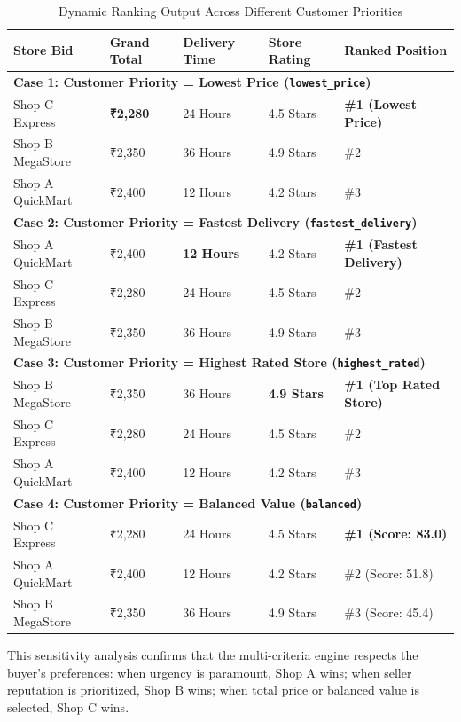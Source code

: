 \begin{table}[H]
\centering
\caption{Dynamic Ranking Output Across Different Customer Priorities}
\label{tab:ranking_sensitivity}
\begin{tabular}{p{2.9cm} p{2.1cm} p{2.3cm} p{2.2cm} >{\raggedright\arraybackslash}p{3.2cm}}
\toprule
\textbf{Store Bid} & \textbf{Grand Total} & \textbf{Delivery Time} & \textbf{Store Rating} & \textbf{Ranked Position} \\
\midrule
\multicolumn{5}{l}{\textbf{Case 1: Customer Priority = Lowest Price (\texttt{lowest\_price})}} \\
Shop C Express & \textbf{₹2,280} & 24 Hours & 4.5 Stars & \textbf{\#1 (Lowest Price)} \\
Shop B MegaStore & ₹2,350 & 36 Hours & 4.9 Stars & \#2 \\
Shop A QuickMart & ₹2,400 & 12 Hours & 4.2 Stars & \#3 \\
\midrule
\multicolumn{5}{l}{\textbf{Case 2: Customer Priority = Fastest Delivery (\texttt{fastest\_delivery})}} \\
Shop A QuickMart & ₹2,400 & \textbf{12 Hours} & 4.2 Stars & \textbf{\#1 (Fastest Delivery)} \\
Shop C Express & ₹2,280 & 24 Hours & 4.5 Stars & \#2 \\
Shop B MegaStore & ₹2,350 & 36 Hours & 4.9 Stars & \#3 \\
\midrule
\multicolumn{5}{l}{\textbf{Case 3: Customer Priority = Highest Rated Store (\texttt{highest\_rated})}} \\
Shop B MegaStore & ₹2,350 & 36 Hours & \textbf{4.9 Stars} & \textbf{\#1 (Top Rated Store)} \\
Shop C Express & ₹2,280 & 24 Hours & 4.5 Stars & \#2 \\
Shop A QuickMart & ₹2,400 & 12 Hours & 4.2 Stars & \#3 \\
\midrule
\multicolumn{5}{l}{\textbf{Case 4: Customer Priority = Balanced Value (\texttt{balanced})}} \\
Shop C Express & ₹2,280 & 24 Hours & 4.5 Stars & \textbf{\#1 (Score: 83.0)} \\
Shop A QuickMart & ₹2,400 & 12 Hours & 4.2 Stars & \#2 (Score: 51.8) \\
Shop B MegaStore & ₹2,350 & 36 Hours & 4.9 Stars & \#3 (Score: 45.4) \\
\bottomrule
\end{tabular}
\end{table}

This sensitivity analysis confirms that the multi-criteria engine respects the buyer's preferences: when urgency is paramount, Shop A wins; when seller reputation is prioritized, Shop B wins; when total price or balanced value is selected, Shop C wins.

